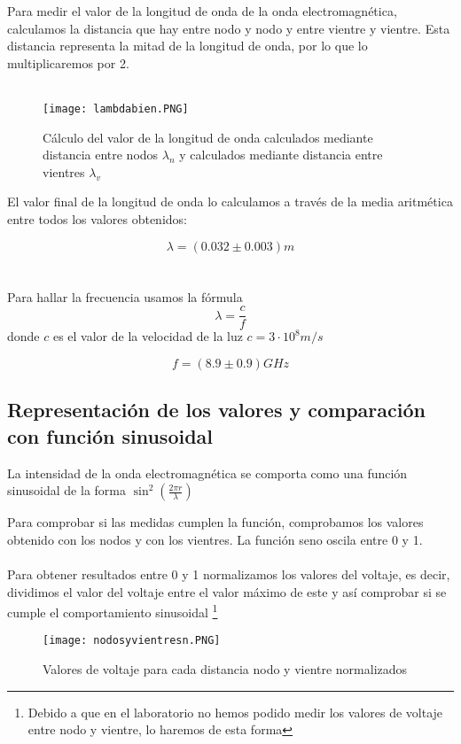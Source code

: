 \documentclass[a4paper,10pt,twocolumns]{article}
\begin{document}
Para medir el valor de la longitud de onda de la onda electromagnética, calculamos la distancia que hay entre nodo y nodo y entre vientre y vientre. Esta distancia representa la mitad de la longitud de onda, por lo que lo multiplicaremos por 2. \\
\\


\begin{figure}[H]
\centering
\caption{Cálculo del valor de la longitud de onda calculados mediante distancia entre nodos $\lambda_n$ y calculados mediante distancia entre vientres $\lambda_v$}
\texttt{[image: lambdabien.PNG]}
\end{figure}


El valor final de la longitud de onda lo calculamos a través de la media aritmética entre todos los valores obtenidos:

$$\boxed{\lambda=(0.032\pm 0.003) m}$$
\\
\\

Para hallar la frecuencia usamos la fórmula $$\lambda = \frac{c}{f}$$ donde $c$ es el valor de la velocidad de la luz $c=3\cdot 10^8 m/s$ 

$$\boxed{f=(8.9 \pm 0.9) GHz }$$

\subsection{Representación de los valores y comparación con función sinusoidal}
La intensidad de la onda electromagnética se comporta como una función sinusoidal de la forma  $\sin^2\left(\frac{2\pi r}{\lambda}\right)$

Para comprobar si las medidas cumplen la función, comprobamos los valores obtenido con los nodos y con los vientres. La función seno oscila entre 0 y 1. \\
\\
Para obtener resultados entre 0 y 1 normalizamos los valores del voltaje, es decir, dividimos el valor del voltaje entre el valor máximo de este y así comprobar si se cumple el comportamiento sinusoidal \footnote{Debido a que en el laboratorio no hemos podido medir los valores de voltaje entre nodo y vientre, lo haremos de esta forma}

\begin{figure}[H]
\caption{Valores de voltaje para cada distancia nodo y vientre normalizados}
\centering
\texttt{[image: nodosyvientresn.PNG]}
\end{figure} 
\end{document}
